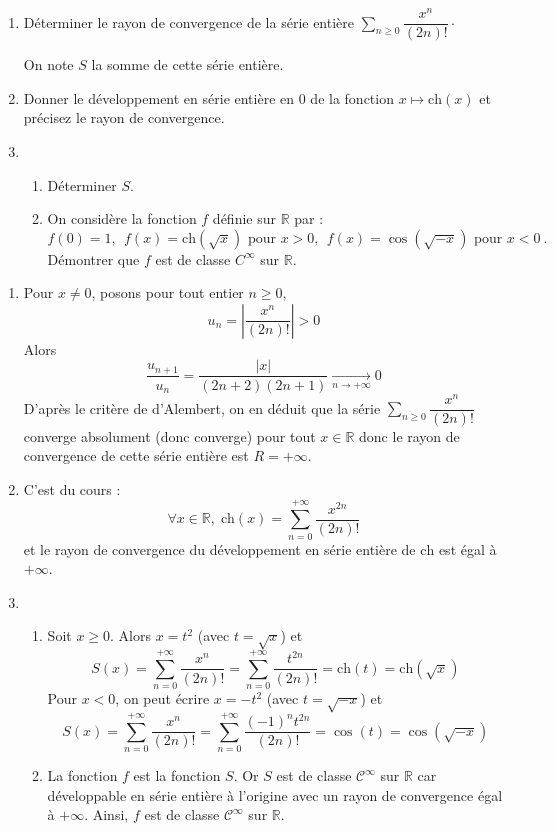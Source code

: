 \documentclass[a4paper,10pt]{report}
\newcommand{\Sum}[2]{\ensuremath{\textstyle{\sum\limits_{#1}^{#2}}}}
\begin{document}
\begin{Exa} \begin{enumerate}
\item Déterminer le rayon de convergence de la série entière $\Sum{n \geq 0}{} \dfrac{x^n}{(2n)!} \cdot$

\noindent On note $S$ la somme de cette série entière.
\item Donner le développement en série entière en 0 de la fonction $x\mapsto \text{ch}(x)$  et précisez le rayon de convergence.
\item \begin{enumerate}
	\item Déterminer $S$.
	\item On considère la fonction $f$ définie sur $\mathbb{R}$ par :
	\begin{equation*}
	f(0)=1,\ \ f(x)=\text{ch}(\sqrt x)\text{ pour $x>0$},\ \ f(x)=\cos(\sqrt{-x})\text{ pour $x<0$}\ .
	\end{equation*}
	Démontrer que $f$ est de classe $C^{\infty}$ sur $\mathbb{R}$.
	\end{enumerate}
\end{enumerate}
\end{Exa}

\corr \begin{enumerate}
\item Pour $x \neq 0$, posons  pour tout entier $n \geq 0$,
 $$u_n  = \left\vert \dfrac{x^n }{(2n)!} \right\vert > 0$$
Alors
$$ \dfrac{u_{n+1}}{u_n} = \dfrac{ \vert x \vert }{(2n+2)(2n+1)} \underset{n \rightarrow + \infty}{\longrightarrow} 0$$
D'après le critère de d'Alembert, on en déduit que la série $\Sum{n \geq 0}{} {\dfrac{{x^n }}{{(2n)!}}} $ converge absolument (donc converge) pour tout $x \in \mathbb{R}$ donc le rayon de convergence de cette série entière est $R =  + \infty $.
\item C'est du cours :
$$\forall x\in \mathbb{R} , \; \textrm{ch} (x) = \displaystyle\sum\limits_{n = 0}^{ + \infty } {\dfrac{{x^{2n} }}{{(2n)!}}} $$ 
et le rayon de convergence du développement en série entière de $\textrm{ch}$  est égal à $ + \infty $.
\item 
\begin{enumerate}
\item Soit $x \geq 0$. Alors $x= t^2$ (avec $t = \sqrt{x}$) et 
$$S(x) = \displaystyle\sum\limits_{n = 0}^{ + \infty } {\dfrac{{x^n }}{{(2n)!}}}  = \displaystyle\sum\limits_{n = 0}^{ + \infty } {\dfrac{{t^{2n} }}{{(2n)!}}}  = \textrm{ch} (t) = \textrm{ch}( \sqrt x) $$
Pour $x < 0$, on peut écrire $x =  - t^2 $ (avec $t=\sqrt{-x}$) et 
$$S(x) = \displaystyle\sum\limits_{n = 0}^{ + \infty } {\dfrac{{x^n }}{{(2n)!}}}  = \displaystyle\sum\limits_{n = 0}^{ + \infty } {\dfrac{{( - 1)^n t^{2n} }}{{(2n)!}}}  = \cos (t) = \cos (\sqrt { - x}) $$
\item La fonction $f$ est la fonction $S$. Or $S$ est  de classe $\mathcal{C}^\infty $ sur $\mathbb{R}$ car développable en série entière à l'origine avec un rayon de convergence égal à $+\infty$. Ainsi, $f$ est  de classe $\mathcal{C}^\infty  $ sur $\mathbb{R}$.
\end{enumerate}
\end{enumerate}
\end{document}
